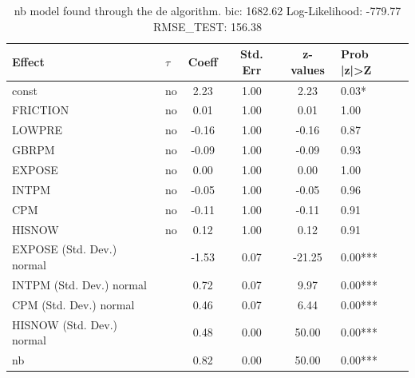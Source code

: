 \begin{table}
	\caption{nb model found through the de algorithm. bic: 1682.62 Log-Likelihood: -779.77 RMSE_TEST: 156.38}
	\begin{center}
		\begin{tabular}{|l|l|c|c|c|l|}
			\hline
			Effect & $\tau$ & Coeff & Std. Err & z-values & Prob |z|>Z \\
			\hline
			const & no & 2.23 & 1.00 & 2.23 & 0.03* \\
			\hline
			FRICTION & no & 0.01 & 1.00 & 0.01 & 1.00 \\
			\hline
			LOWPRE & no & -0.16 & 1.00 & -0.16 & 0.87 \\
			\hline
			GBRPM & no & -0.09 & 1.00 & -0.09 & 0.93 \\
			\hline
			EXPOSE & no & 0.00 & 1.00 & 0.00 & 1.00 \\
			\hline
			INTPM & no & -0.05 & 1.00 & -0.05 & 0.96 \\
			\hline
			CPM & no & -0.11 & 1.00 & -0.11 & 0.91 \\
			\hline
			HISNOW & no & 0.12 & 1.00 & 0.12 & 0.91 \\
			\hline
			EXPOSE (Std. Dev.) normal &  & -1.53 & 0.07 & -21.25 & 0.00*** \\
			\hline
			INTPM (Std. Dev.) normal &  & 0.72 & 0.07 & 9.97 & 0.00*** \\
			\hline
			CPM (Std. Dev.) normal &  & 0.46 & 0.07 & 6.44 & 0.00*** \\
			\hline
			HISNOW (Std. Dev.) normal &  & 0.48 & 0.00 & 50.00 & 0.00*** \\
			\hline
			nb &  & 0.82 & 0.00 & 50.00 & 0.00*** \\
			\hline
		\end{tabular}
	\end{center}
\end{table}